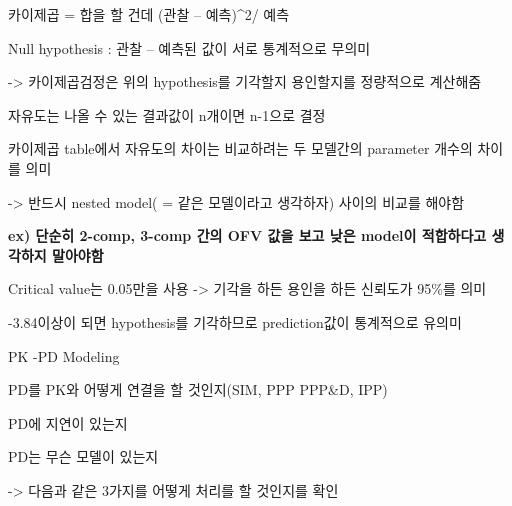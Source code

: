 \documentclass[
]{article}
\begin{document}
카이제곱 = 합을 할 건데 (관찰 -- 예측)\^{}2/ 예측

Null hypothesis : 관찰 -- 예측된 값이 서로 통계적으로 무의미

-\textgreater{} 카이제곱검정은 위의 hypothesis를 기각할지 용인할지를
정량적으로 계산해줌

자유도는 나올 수 있는 결과값이 n개이면 n-1으로 결정

카이제곱 table에서 자유도의 차이는 비교하려는 두 모델간의 parameter
개수의 차이를 의미

-\textgreater{} 반드시 nested model( = 같은 모델이라고 생각하자) 사이의
비교를 해야함

\textbf{ex) 단순히 2-comp, 3-comp 간의 OFV 값을 보고 낮은 model이
적합하다고 생각하지 말아야함}

Critical value는 0.05만을 사용 -\textgreater{} 기각을 하든 용인을 하든
신뢰도가 95\%를 의미

-3.84이상이 되면 hypothesis를 기각하므로 prediction값이 통계적으로
유의미

PK -PD Modeling

PD를 PK와 어떻게 연결을 할 것인지(SIM, PPP PPP\&D, IPP)

PD에 지연이 있는지

PD는 무슨 모델이 있는지

-\textgreater{} 다음과 같은 3가지를 어떻게 처리를 할 것인지를 확인
\end{document}
